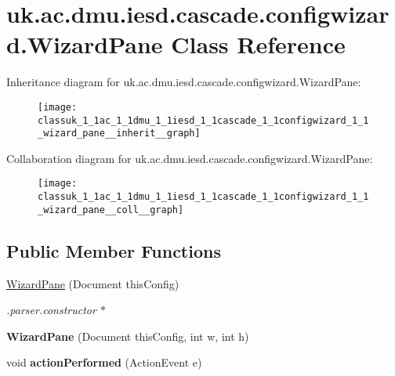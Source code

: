 \hypertarget{classuk_1_1ac_1_1dmu_1_1iesd_1_1cascade_1_1configwizard_1_1_wizard_pane}{\section{uk.\-ac.\-dmu.\-iesd.\-cascade.\-configwizard.\-Wizard\-Pane Class Reference}
\label{classuk_1_1ac_1_1dmu_1_1iesd_1_1cascade_1_1configwizard_1_1_wizard_pane}
}


Inheritance diagram for uk.\-ac.\-dmu.\-iesd.\-cascade.\-configwizard.\-Wizard\-Pane\-:\nopagebreak
\begin{figure}[H]
\begin{center}
\leavevmode
\texttt{[image: classuk\_1\_1ac\_1\_1dmu\_1\_1iesd\_1\_1cascade\_1\_1configwizard\_1\_1\_wizard\_pane\_\_inherit\_\_graph]}
\end{center}
\end{figure}


Collaboration diagram for uk.\-ac.\-dmu.\-iesd.\-cascade.\-configwizard.\-Wizard\-Pane\-:\nopagebreak
\begin{figure}[H]
\begin{center}
\leavevmode
\texttt{[image: classuk\_1\_1ac\_1\_1dmu\_1\_1iesd\_1\_1cascade\_1\_1configwizard\_1\_1\_wizard\_pane\_\_coll\_\_graph]}
\end{center}
\end{figure}
\subsection*{Public Member Functions}
\begin{DoxyCompactItemize}
\item 
\hypertarget{classuk_1_1ac_1_1dmu_1_1iesd_1_1cascade_1_1configwizard_1_1_wizard_pane_ac8610874ff565cf59751939aa234fae6}{\hyperlink{classuk_1_1ac_1_1dmu_1_1iesd_1_1cascade_1_1configwizard_1_1_wizard_pane_ac8610874ff565cf59751939aa234fae6}{Wizard\-Pane} (Document this\-Config)}\label{classuk_1_1ac_1_1dmu_1_1iesd_1_1cascade_1_1configwizard_1_1_wizard_pane_ac8610874ff565cf59751939aa234fae6}

\begin{DoxyCompactList}\small\item\em .parser.\-constructor $\ast$ \end{DoxyCompactList}\item 
\hypertarget{classuk_1_1ac_1_1dmu_1_1iesd_1_1cascade_1_1configwizard_1_1_wizard_pane_aa6ef552225145e5833f78afd64adc3b6}{{\bfseries Wizard\-Pane} (Document this\-Config, int w, int h)}\label{classuk_1_1ac_1_1dmu_1_1iesd_1_1cascade_1_1configwizard_1_1_wizard_pane_aa6ef552225145e5833f78afd64adc3b6}

\item 
\hypertarget{classuk_1_1ac_1_1dmu_1_1iesd_1_1cascade_1_1configwizard_1_1_wizard_pane_aa71b7e2c607112620ba9a09f8069e0bd}{void {\bfseries action\-Performed} (Action\-Event e)}\label{classuk_1_1ac_1_1dmu_1_1iesd_1_1cascade_1_1configwizard_1_1_wizard_pane_aa71b7e2c607112620ba9a09f8069e0bd}

\end{DoxyCompactItemize}


